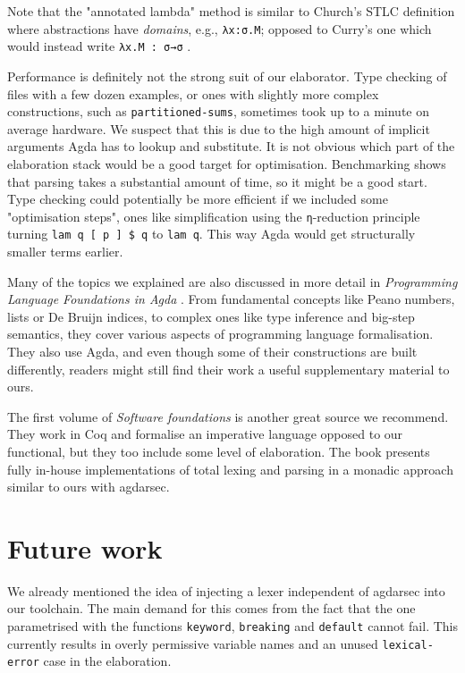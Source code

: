 Note that the "annotated lambda" method is similar to Church's STLC definition where abstractions have \textit{domains}, e.g., \verb$λx:σ.M$; opposed to Curry's one which would instead write \verb$λx.M : σ→σ$ \cite{sorensen1998curry}.

Performance is definitely not the strong suit of our elaborator. Type checking of files with a few dozen examples, or ones with slightly more complex constructions, such as \verb$partitioned-sums$, sometimes took up to a minute on average hardware. We suspect that this is due to the high amount of implicit arguments Agda has to lookup and substitute. It is not obvious which part of the elaboration stack would be a good target for optimisation. Benchmarking shows that parsing takes a substantial amount of time, so it might be a good start. Type checking could potentially be more efficient if we included some "optimisation steps", ones like simplification using the \verb$η$-reduction principle turning \verb$lam q [ p ] $\verb$$\verb=$=\verb$$\verb$ q$ to \verb$lam q$. This way Agda would get structurally smaller terms earlier.

Many of the topics we explained are also discussed in more detail in \textit{Programming Language Foundations in Agda} \cite{plfa22.08}. From fundamental concepts like Peano numbers, lists or De Bruijn indices, to complex ones like type inference and big-step semantics, they cover various aspects of programming language formalisation. They also use Agda, and even though some of their constructions are built differently, readers might still find their work a useful supplementary material to ours.

The first volume of \textit{Software foundations} \cite{Pierce:SF1} is another great source we recommend. They work in Coq and formalise an imperative language opposed to our functional, but they too include some level of elaboration. The book presents fully in-house implementations of total lexing and parsing in a monadic approach similar to ours with agdarsec.

\section{Future work}

We already mentioned the idea of injecting a lexer independent of agdarsec into our toolchain. The main demand for this comes from the fact that the one parametrised with the functions \verb$keyword$, \verb$breaking$ and \verb$default$ cannot fail. This currently results in overly permissive variable names and an unused \verb$lexical-error$ case in the elaboration.

